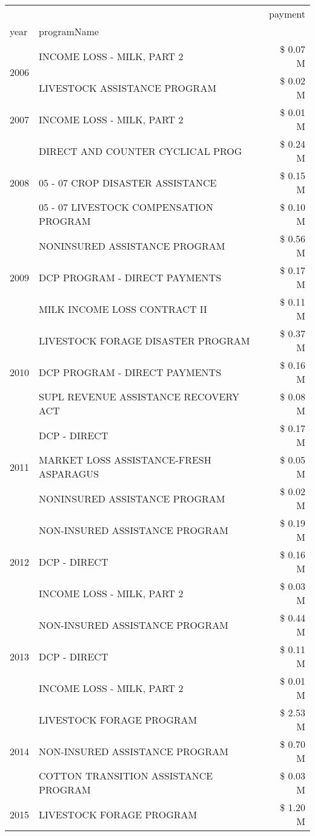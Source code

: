 \begin{tabular}{llr}
\toprule
 &  & payment \\
year & programName &  \\
\midrule
\multirow[t]{2}{*}{2006} & INCOME LOSS - MILK, PART 2 & \$ 0.07 M \\
 & LIVESTOCK ASSISTANCE PROGRAM & \$ 0.02 M \\
\cline{1-3}
2007 & INCOME LOSS - MILK, PART 2 & \$ 0.01 M \\
\cline{1-3}
\multirow[t]{3}{*}{2008} & DIRECT AND COUNTER CYCLICAL PROG & \$ 0.24 M \\
 & 05 - 07 CROP DISASTER ASSISTANCE & \$ 0.15 M \\
 & 05 - 07 LIVESTOCK COMPENSATION PROGRAM & \$ 0.10 M \\
\cline{1-3}
\multirow[t]{3}{*}{2009} & NONINSURED ASSISTANCE PROGRAM & \$ 0.56 M \\
 & DCP PROGRAM - DIRECT PAYMENTS & \$ 0.17 M \\
 & MILK INCOME LOSS CONTRACT II & \$ 0.11 M \\
\cline{1-3}
\multirow[t]{3}{*}{2010} & LIVESTOCK FORAGE DISASTER  PROGRAM & \$ 0.37 M \\
 & DCP PROGRAM - DIRECT PAYMENTS & \$ 0.16 M \\
 & SUPL REVENUE ASSISTANCE RECOVERY ACT & \$ 0.08 M \\
\cline{1-3}
\multirow[t]{3}{*}{2011} & DCP - DIRECT & \$ 0.17 M \\
 & MARKET LOSS ASSISTANCE-FRESH ASPARAGUS & \$ 0.05 M \\
 & NONINSURED ASSISTANCE PROGRAM & \$ 0.02 M \\
\cline{1-3}
\multirow[t]{3}{*}{2012} & NON-INSURED ASSISTANCE PROGRAM & \$ 0.19 M \\
 & DCP - DIRECT & \$ 0.16 M \\
 & INCOME LOSS - MILK, PART 2 & \$ 0.03 M \\
\cline{1-3}
\multirow[t]{3}{*}{2013} & NON-INSURED ASSISTANCE PROGRAM & \$ 0.44 M \\
 & DCP - DIRECT & \$ 0.11 M \\
 & INCOME LOSS - MILK, PART 2 & \$ 0.01 M \\
\cline{1-3}
\multirow[t]{3}{*}{2014} & LIVESTOCK FORAGE PROGRAM & \$ 2.53 M \\
 & NON-INSURED ASSISTANCE PROGRAM & \$ 0.70 M \\
 & COTTON TRANSITION ASSISTANCE PROGRAM & \$ 0.03 M \\
\cline{1-3}
\multirow[t]{3}{*}{2015} & LIVESTOCK FORAGE PROGRAM & \$ 1.20 M \\

\end{tabular}
